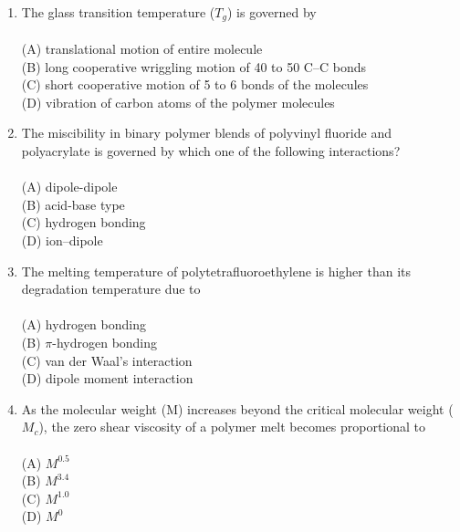 \documentclass[journal,12pt,onecolumn]{IEEEtran}
\begin{document}
\begin{enumerate}[label=\arabic*)]
\item The glass transition temperature ($T_g$) is governed by\\
\vspace{0.2cm}
\hfill{} \\
(A) translational motion of entire molecule\\
(B) long cooperative wriggling motion of 40 to 50 C–C bonds\\
(C) short cooperative motion of 5 to 6 bonds of the molecules\\
(D) vibration of carbon atoms of the polymer molecules
\vspace{0.5cm}

\item The miscibility in binary polymer blends of polyvinyl fluoride and polyacrylate is governed by which one of the following interactions?\\
\vspace{0.2cm}
\hfill{} \\
(A) dipole-dipole\\
(B) acid-base type\\
(C) hydrogen bonding\\
(D) ion–dipole
\vspace{0.5cm}

\newpage

\item The melting temperature of polytetrafluoroethylene is higher than its degradation temperature due to\\
\vspace{0.2cm}
\hfill{} \\
(A) hydrogen bonding\\
(B) $\pi$-hydrogen bonding\\
(C) van der Waal’s interaction\\
(D) dipole moment interaction
\vspace{0.5cm}

\item As the molecular weight (M) increases beyond the critical molecular weight ($M_c$), the zero shear viscosity of a polymer melt becomes proportional to\\
\vspace{0.2cm}
\hfill{} \\
(A) $M^{0.5}$\\
(B) $M^{3.4}$\\
(C) $M^{1.0}$\\
(D) $M^0$
\vspace{0.5cm}


\end{enumerate}
\end{document}
